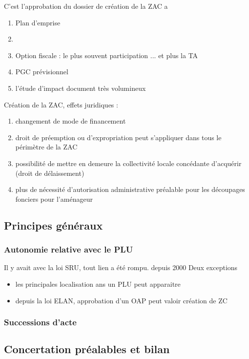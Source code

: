 	C'est l'approbation du dossier de création de la ZAC a
	\begin{enumerate}
		\item Plan d'emprise
		\item
		\item Option fiscale : le plus souvent participation ... et plus la TA
		\item PGC prévisionnel
		\item l'étude d'impact document très volumineux
	\end{enumerate}

	Création de la ZAC, effets juridiques :
	\begin{enumerate}
		\item changement de mode de financement
		\item droit de préemption ou d'expropriation peut s'appliquer dans tous le périmètre de la ZAC
		\item possibilité de mettre en demeure la collectivité locale concédante d'acquérir (droit de délaissement)
		\item plus de nécessité d'autorisation administrative préalable pour les découpages fonciers pour l'aménageur
	\end{enumerate}

	\subsection{Principes généraux}

		\subsubsection{Autonomie relative avec le PLU}

		Il y avait avec la loi SRU, tout lien a été rompu. depuis 2000
		Deux exceptions
		\begin{itemize}
			\item les principales localisation ans un PLU peut apparaitre
			\item depuis la loi ELAN, approbation d'un OAP peut valoir création de ZC
		\end{itemize}

		\subsubsection{Successions d'acte}

	\subsection{Concertation préalables et bilan}


